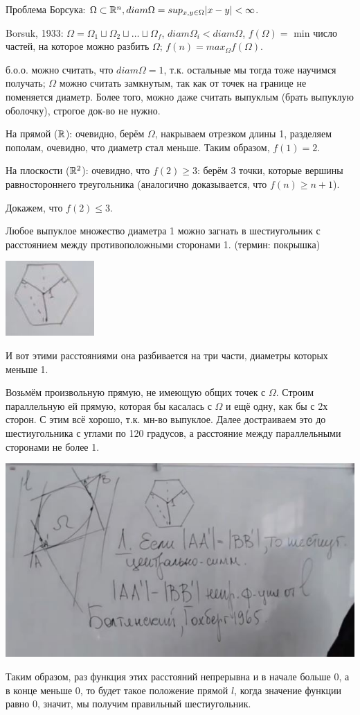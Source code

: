 Проблема Борсука: $\Omega \subset \mathbb{R}^n, diam \Omega = sup_{x, y \in \Omega} |x - y| < \infty$.

Borsuk, 1933: $\Omega = \Omega_1 \sqcup \Omega_2 \sqcup \dots \sqcup \Omega_f$, $diam \Omega_i < diam \Omega$, $f(\Omega) = $ min число частей, на которое можно разбить $\Omega$; $f(n) = max_{\Omega} f(\Omega)$.

б.о.о. можно считать, что $diam \Omega = 1$, т.к. остальные мы тогда тоже научимся получать; $\Omega$ можно считать замкнутым, так как от точек на границе не поменяется диаметр. Более того, можно даже считать выпуклым (брать выпуклую оболочку), строгое док-во не нужно.

На прямой ($\mathbb{R}$): очевидно, берём $\Omega$, накрываем отрезком длины 1, разделяем пополам, очевидно, что диаметр стал меньше. Таким образом, $f(1) = 2$.

На плоскости ($\mathbb{R}^2$): очевидно, что $f(2) \geqslant 3$: берём 3 точки, которые вершины равностороннего треугольника (аналогично доказывается, что $f(n) \geqslant n + 1$).

Докажем, что $f(2) \leqslant 3$. 

\Statement Любое выпуклое множество диаметра 1 можно загнать в шестиугольник с расстоянием между противоположными сторонами 1. (термин: покрышка)

\includegraphics[]{images/72.JPG} 

И вот этими расстояниями она разбивается на три части, диаметры которых меньше 1.

\Proof

Возьмём произвольную прямую, не имеющую общих точек с $\Omega$. Строим параллельную ей прямую, которая бы касалась с $\Omega$ и ещё одну, как бы с 2х сторон. С этим всё хорошо, т.к. мн-во выпуклое. Далее достраиваем это до шестиугольника с углами по 120 градусов, а расстояние между параллельными сторонами не более 1.

\includegraphics[]{images/72_3.JPG}

Таким образом, раз функция этих расстояний непрерывна и в начале больше 0, а в конце меньше 0, то будет такое положение прямой $l$, когда значение функции равно 0, значит, мы получим правильный шестиугольник.

\EndProof